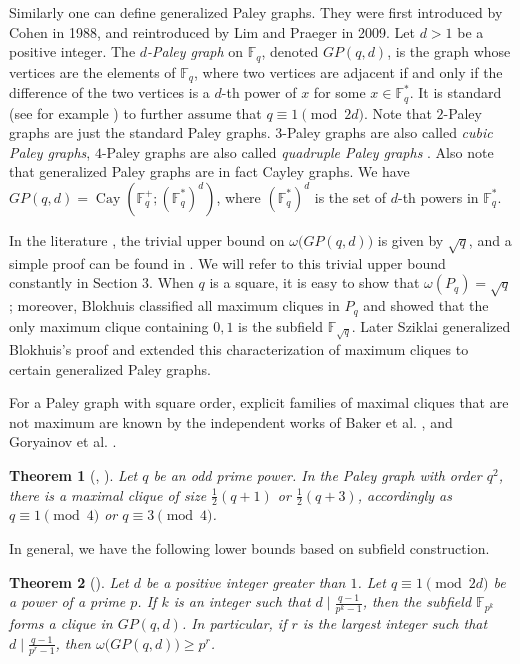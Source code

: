 \documentclass[12pt,oneside]{amsart}
\newtheorem{thm}{Theorem}[section]
\newcommand{\F}{\mathbb{F}}
\begin{document}
Similarly one can define generalized Paley graphs. They were first introduced by Cohen \cite{SC} in 1988, and reintroduced by Lim and Praeger \cite{LP} in 2009. Let $d>1$ be a positive integer. The {\em $d$-Paley graph} on $\F_q$, denoted $GP(q,d)$, is the graph whose vertices are the elements of $\F_q$, where two vertices are adjacent if and only if the difference of the two vertices is a $d$-th power of $x$ for some $x \in \F_q^*$. It is standard (see for example \cite[Section 4]{SC}) to further assume that $q \equiv 1 \pmod {2d}$. Note that $2$-Paley graphs are just the standard Paley graphs. $3$-Paley graphs are also called {\em cubic Paley graphs}, $4$-Paley graphs are also called {\em quadruple Paley graphs} \cite{WA}. Also note that generalized Paley graphs are in fact Cayley graphs. We have $GP(q,d)=\operatorname{Cay}(\F_q^+;(\F_q^*)^d)$, where $(\F_q^*)^d$ is the set of $d$-th powers in $\F_q^*$. 

In the literature \cite{BDR,SC,HP,Yip,Yip2}, the trivial upper bound on $\omega\big(GP(q,d)\big)$ is given by $\sqrt{q}$, and a simple proof can be found in \cite[Lemma 5.2]{Yip2}. We will refer to this trivial upper bound constantly in Section 3. When $q$ is a square, it is easy to show that $\omega(P_q)=\sqrt{q}$; moreover, Blokhuis \cite{AB} classified all maximum cliques in $P_q$ and showed that the only maximum clique containing $0,1$ is the subfield $\F_{\sqrt{q}}$. Later Sziklai \cite{PS} generalized Blokhuis's proof and extended this characterization of maximum cliques to certain generalized Paley graphs.

For a Paley graph with square order, explicit families of maximal cliques that are not maximum are known by the independent works of Baker et al. \cite{BEHW}, and Goryainov et al. \cite{GKSV}. 

\begin{thm}[\cite{BEHW}, \cite{GKSV}] \label{max2}
Let $q$ be an odd prime power. In the Paley graph with order $q^2$, there is a maximal clique of size $\frac{1}{2}(q+1)$ or $\frac{1}{2}(q+3)$, accordingly as $q \equiv 1\pmod 4$ or $q \equiv 3 \pmod 4$.
\end{thm}


In general, we have the following lower bounds based on subfield construction.

\begin{thm}[\cite{BDR}]\label{t4}
Let $d$ be a positive integer greater than $1$. Let $q \equiv 1 \pmod {2d}$ be a power of a prime $p$. If $k$ is an integer such that $d \mid \frac{q-1}{p^k-1}$, then the subfield $\F_{p^k}$ forms a clique in $GP(q,d)$. In particular, if $r$ is the largest integer such that $d \mid \frac{q-1}{p^r-1}$, then $\omega\big(GP(q,d)\big) \geq p^r$.
\end{thm}
\end{document}
